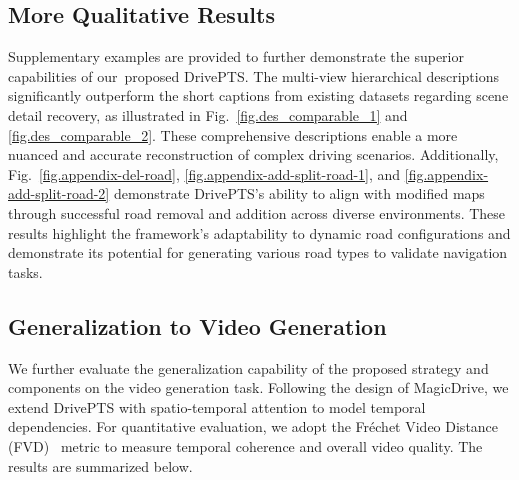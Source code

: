 \subsection{More Qualitative Results}
Supplementary examples are provided to further demonstrate the superior capabilities of our proposed DrivePTS. 
The multi-view hierarchical descriptions significantly outperform the short captions from existing datasets regarding scene detail recovery, as illustrated in Fig.~\ref{fig.des_comparable_1} and \ref{fig.des_comparable_2}. 
These comprehensive descriptions enable a more nuanced and accurate reconstruction of complex driving scenarios.
Additionally, Fig.~\ref{fig.appendix-del-road}, \ref{fig.appendix-add-split-road-1}, and \ref{fig.appendix-add-split-road-2} demonstrate DrivePTS's ability to align with modified maps through successful road removal and addition across diverse environments. 
These results highlight the framework's adaptability to dynamic road configurations and demonstrate its potential for generating various road types to validate navigation tasks.

\subsection{Generalization to Video Generation}
We further evaluate the generalization capability of the proposed strategy and components on the video generation task.
Following the design of MagicDrive, we extend DrivePTS with spatio-temporal attention to model temporal dependencies.
For quantitative evaluation, we adopt the Fréchet Video Distance (FVD)~\cite{unterthiner2018towards} metric to measure temporal coherence and overall video quality.
The results are summarized below.

\begin{table}[H]
	\centering
	\caption{
		Comparison of temporal consistency for different video generation methods on the NuScenes dataset. 
		Lower FVD scores indicate better temporal coherence.
	}
	\label{Tab.video-fvd-horizontal}
\end{table}

